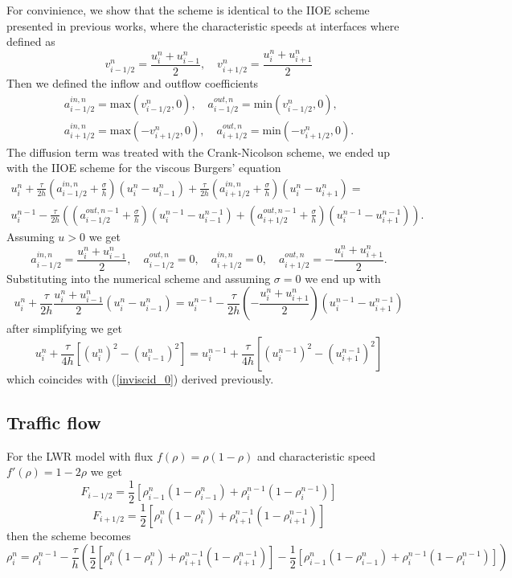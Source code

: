\documentclass{article}
\begin{document}
For convinience, we show that the scheme is identical to the IIOE scheme presented in previous works, where the characteristic speeds at interfaces where defined as
\[ v^{n}_{i-1/2} = \dfrac{u^{n}_i + u^{n}_{i-1}}{2},\quad
v^{n}_{i+1/2} = \dfrac{u^{n}_i + u^{n}_{i+1}}{2} \]
Then we defined the inflow and outflow coefficients
\begin{eqnarray}
	a^{in,n}_{i-1/2} = \textrm{max}(v^{n}_{i-1/2},0),\quad 
	a^{out,n}_{i-1/2} = \textrm{min}(v^{n}_{i-1/2},0), \nonumber
	\\
	a^{in,n}_{i+1/2} = \textrm{max}(-v^{n}_{i+1/2},0),\quad 
	a^{out,n}_{i+1/2} = \textrm{min}(-v^{n}_{i+1/2},0). \nonumber
\end{eqnarray}
The diffusion term was treated with the Crank-Nicolson scheme, we ended up with the IIOE scheme for the viscous Burgers' equation
\begin{eqnarray}
	\label{viscBurg}
	u^n_i + \frac{\tau}{2h} \left(a^{in,n}_{i - 1/2} + \frac{\sigma}{h} \right) \left(u^n_i - u^n_{i-1}\right) + 
	\frac{\tau}{2h} \left(a^{in,n}_{i + 1/2} + \frac{\sigma}{h} \right) \left(u^n_i - u^n_{i+1}\right) = \\
	u^{n-1}_i - \frac{\tau}{2h} \left(\left(a^{out,n-1}_{i - 1/2} + \frac{\sigma}{h} \right) \left(u^{n-1}_i - u^{n-1}_{i-1}\right) + 
	\left(a^{out,n-1}_{i + 1/2} + \frac{\sigma}{h} \right) \left(u^{n-1}_i - u^{n-1}_{i+1}\right)\right).\nonumber
\end{eqnarray}
Assuming $ u > 0 $ we get \\
\[
a^{in,n}_{i-1/2} = \dfrac{u^{n}_i + u^{n}_{i-1}}{2},\quad a^{out,n}_{i-1/2} = 0,\quad a^{in,n}_{i + 1/2} = 0,\quad a^{out,n}_{i+1/2} = -\dfrac{u^{n}_i + u^{n}_{i+1}}{2}.
\]
Substituting into the numerical scheme and assuming $ \sigma = 0 $ we end up with
\begin{equation}
	u^n_i + \frac{\tau}{2h} \dfrac{u^{n}_i + u^{n}_{i-1}}{2} \left(u^n_i - u^n_{i-1}\right)
	= 
	u^{n-1}_i - \frac{\tau}{2h} 
	\left(-\dfrac{u^{n}_i + u^{n}_{i+1}}{2}\right) \left(u^{n-1}_i - u^{n-1}_{i+1}\right)
\end{equation}
after simplifying we get
\begin{equation}
	\label{inviscid_1}
u_i^{n} + \dfrac{\tau}{4h}\left[(u^n_{i})^2 - (u^n_{i-1})^2\right] = 
u_i^{n - 1} + \dfrac{\tau}{4h}\left[(u^{n-1}_{i})^2 - (u^{n-1}_{i+1})^2\right]
\end{equation}
which coincides with (\ref{inviscid_0}) derived previously.

\subsection{Traffic flow}
For the LWR model with flux $ f(\rho) = \rho (1 - \rho) $ and characteristic speed $ f'(\rho) = 1 - 2\rho $ we get
\[
F_{i - 1/2} = \frac{1}{2}\left[\rho^n_{i-1} (1 - \rho^n_{i-1}) + \rho^{n-1}_{i} (1 - \rho^{n-1}_{i}) \right]
\]
\[
F_{i + 1/2} = \frac{1}{2}\left[\rho^n_{i} (1 - \rho^n_{i}) + \rho^{n-1}_{i+1} (1 - \rho^{n-1}_{i+1}) \right]
\]
then the scheme becomes
\[
	\rho_i^{n} = \rho_i^{n - 1} - \dfrac{\tau}{h}
	\left(\frac{1}{2}\left[\rho^n_{i} (1 - \rho^n_{i}) + \rho^{n-1}_{i+1} (1 - \rho^{n-1}_{i+1}) \right]
	 - 
	 \frac{1}{2}\left[\rho^n_{i-1} (1 - \rho^n_{i-1}) + \rho^{n-1}_{i} (1 - \rho^{n-1}_{i}) \right]\right)
\]
\end{document}
